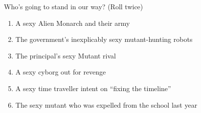 \documentclass[twocolumn, 11pt
]{article}
\providecommand{\tightlist}{%
  \setlength{\itemsep}{0pt}\setlength{\parskip}{0pt}}
\begin{document}
Who's going to stand in our way? (Roll twice)

\begin{enumerate}
\def\labelenumi{\arabic{enumi}.}
\tightlist
\item
  A sexy Alien Monarch and their army
\item
  The government's inexplicably sexy mutant-hunting robots
\item
  The principal's sexy Mutant rival
\item
  A sexy cyborg out for revenge
\item
  A sexy time traveller intent on ``fixing the timeline''
\item
  The sexy mutant who was expelled from the school last year
\end{enumerate}
\end{document}
